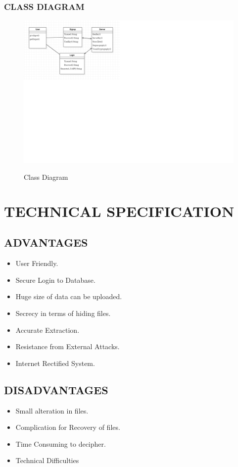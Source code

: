 \documentclass[12pt]{extreport}
\begin{document}
    \subsection{CLASS DIAGRAM}
    \begin{figure}[H]
    \centering
  \includegraphics[scale=0.75]{Class.png}\\
  \caption{Class Diagram}
  
\end{figure}
\chapter{TECHNICAL SPECIFICATION}

\section{ADVANTAGES}
\begin{itemize}

\item User Friendly.
\item Secure Login to Database.
\item Huge size of data can be uploaded.
\item Secrecy in terms of hiding files.
\item Accurate Extraction.
\item Resistance from External Attacks.
\item Internet Rectified System.
\end{itemize}
\section{DISADVANTAGES}
\begin{itemize}


 \item 	Small alteration in files.
 \item Complication for Recovery of files.
 \item Time Consuming to decipher.
 \item Technical Difficulties 
\end{itemize} 
\newpage
\end{document}
